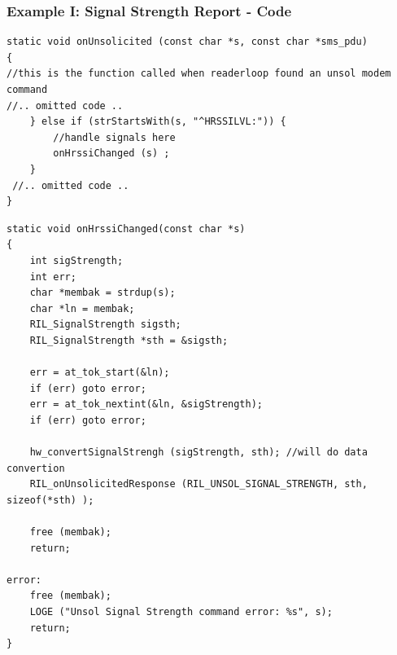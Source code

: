 \documentclass{beamer}
\begin{document}
\begin{frame}[fragile]
    \frametitle{Example I: Signal Strength Report - Code}
    \lstset{language=C}
  \begin{lstlisting}
static void onUnsolicited (const char *s, const char *sms_pdu)
{
//this is the function called when readerloop found an unsol modem command
//.. omitted code ..
    } else if (strStartsWith(s, "^HRSSILVL:")) {
        //handle signals here
        onHrssiChanged (s) ;
    }
 //.. omitted code ..
}
  \end{lstlisting}
  \begin{lstlisting}
static void onHrssiChanged(const char *s) 
{
    int sigStrength;
    int err;
    char *membak = strdup(s);
    char *ln = membak;
    RIL_SignalStrength sigsth;
    RIL_SignalStrength *sth = &sigsth;

    err = at_tok_start(&ln);
    if (err) goto error;
    err = at_tok_nextint(&ln, &sigStrength);
    if (err) goto error;

    hw_convertSignalStrengh (sigStrength, sth); //will do data convertion
    RIL_onUnsolicitedResponse (RIL_UNSOL_SIGNAL_STRENGTH, sth, sizeof(*sth) );

    free (membak);
    return;

error:
    free (membak);
    LOGE ("Unsol Signal Strength command error: %s", s);
    return;
}
  \end{lstlisting}
\end{frame}
\end{document}
